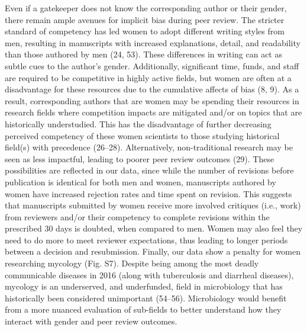 \documentclass[11pt,]{article}
\begin{document}
Even if a gatekeeper does not know the corresponding author or their
gender, there remain ample avenues for implicit bias during peer review.
The stricter standard of competency has led women to adopt different
writing styles from men, resulting in manuscripts with increased
explanations, detail, and readability than those authored by men (24,
53). These differences in writing can act as subtle cues to the author's
gender. Additionally, significant time, funds, and staff are required to
be competitive in highly active fields, but women are often at a
disadvantage for these resources due to the cumulative affects of bias
(8, 9). As a result, corresponding authors that are women may be
spending their resources in research fields where competition impacts
are mitigated and/or on topics that are historically understudied. This
has the disadvantage of further decreasing perceived competency of these
women scientists to those studying historical field(s) with precedence
(26--28). Alternatively, non-traditional research may be seen as less
impactful, leading to poorer peer review outcomes (29). These
possibilities are reflected in our data, since while the number of
revisions before publication is identical for both men and women,
manuscripts authored by women have increased rejection rates and time
spent on revision. This suggests that manuscripts submitted by women
receive more involved critiques (i.e., work) from reviewers and/or their
competency to complete revisions within the prescribed 30 days is
doubted, when compared to men. Women may also feel they need to do more
to meet reviewer expectations, thus leading to longer periods between a
decision and resubmission. Finally, our data show a penalty for women
researching mycology (Fig. S7). Despite being among the most deadly
communicable diseases in 2016 (along with tuberculosis and diarrheal
diseases), mycology is an underserved, and underfunded, field in
microbiology that has historically been considered unimportant (54--56).
Microbiology would benefit from a more nuanced evaluation of sub-fields
to better understand how they interact with gender and peer review
outcomes.
\end{document}
